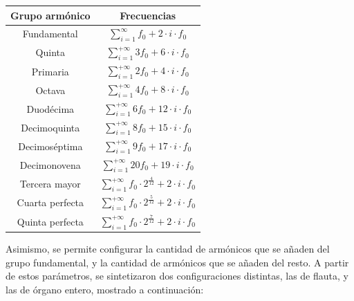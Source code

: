 \begin{table}[H]
\centering
\begin{tabular}{@{}cc@{}}
\toprule
\textbf{Grupo armónico} & \textbf{Frecuencias} \\ \midrule
Fundamental & $\sum_{i = 1}^{\infty} f_0 + 2\cdot i \cdot f_0$ \\ 
Quinta & $\sum_{i = 1}^{+\infty} 3f_0 + 6\cdot i \cdot f_0$ \\ 
 Primaria& $\sum_{i = 1}^{+\infty} 2f_0 + 4\cdot i \cdot f_0$ \\ 
 Octava& $\sum_{i = 1}^{+\infty} 4f_0 + 8\cdot i \cdot f_0$ \\ 
 Duodécima& $\sum_{i = 1}^{+\infty} 6f_0 + 12\cdot i \cdot f_0$ \\ 
 Decimoquinta& $\sum_{i = 1}^{+\infty} 8f_0 + 15\cdot i \cdot f_0$ \\ 
 Decimoséptima& $\sum_{i = 1}^{+\infty} 9f_0 + 17\cdot i \cdot f_0$ \\ 
 Decimonovena& $\sum_{i = 1}^{+\infty} 20f_0 + 19\cdot i \cdot f_0$ \\ 
 Tercera mayor& $\sum_{i = 1}^{+\infty} f_0 \cdot 2^{\frac{4}{12}} + 2\cdot i \cdot f_0$ \\ 
 Cuarta perfecta& $\sum_{i = 1}^{+\infty} f_0 \cdot 2^{\frac{5}{12}} + 2\cdot i \cdot f_0$ \\ 
 Quinta perfecta& $\sum_{i = 1}^{+\infty} f_0 \cdot 2^{\frac{7}{12}} + 2\cdot i \cdot f_0$ \\ \bottomrule
\end{tabular}
\end{table}

Asimismo, se permite configurar la cantidad de armónicos que se añaden del grupo fundamental, y la cantidad de armónicos que se añaden del resto. A partir de estos parámetros, se sintetizaron dos configuraciones distintas, las de flauta, y las de órgano entero, mostrado a continuación:

